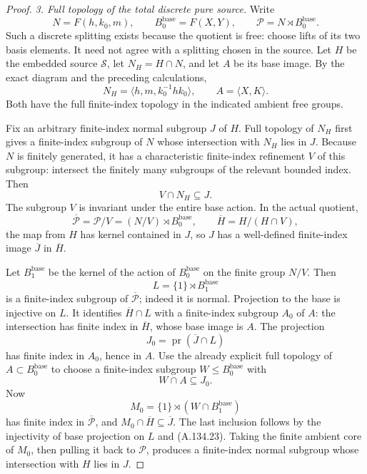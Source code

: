 \begin{proof}
\emph{3. Full topology of the total discrete pure source.}
Write
\[
 N=F(h,k_0,m),\qquad B_0^{\mathrm{base}}=F(X,Y),
 \qquad \mathcal P=N\rtimes B_0^{\mathrm{base}}.
 \tag{A.134.18}
\]
Such a discrete splitting exists because the quotient is
free: choose lifts of its two basis elements. It need not
agree with a splitting chosen in the source.
Let \(H\) be the embedded source \(\mathcal S\),
let \(N_H=H\cap N\), and let \(A\) be its base image.
By the exact diagram and the preceding calculations,
\[
 N_H=\langle h,m,k_0^{-1}hk_0\rangle,\qquad
                         A=\langle X,K\rangle.
 \tag{A.134.19}
\]
Both have the full finite-index topology in the indicated
ambient free groups.

Fix an arbitrary finite-index normal subgroup \(J\) of \(H\).
Full topology of \(N_H\) first gives a finite-index subgroup
of \(N\) whose intersection with \(N_H\) lies in \(J\).
Because \(N\) is finitely generated, it has a characteristic
finite-index refinement \(V\) of this subgroup: intersect
the finitely many subgroups of the relevant bounded index.
Then
\[
                  V\cap N_H\subseteq J.
 \tag{A.134.20}
\]
The subgroup \(V\) is invariant under the entire base action.
In the actual quotient,
\[
 \overline{\mathcal P}=\mathcal P/V
          =(N/V)\rtimes B_0^{\mathrm{base}},
 \qquad
 \overline H=H/(H\cap V),
 \tag{A.134.21}
\]
the map from \(H\) has kernel contained in \(J\), so \(J\)
has a well-defined finite-index image \(\overline J\)
in \(\overline H\).

Let \(B_1^{\mathrm{base}}\) be the kernel of the action of
\(B_0^{\mathrm{base}}\) on the finite group \(N/V\).
Then
\[
 L=\{1\}\rtimes B_1^{\mathrm{base}}
\]
is a finite-index subgroup of \(\overline{\mathcal P}\);
indeed it is normal. Projection to the base is injective
on \(L\). It identifies \(\overline H\cap L\) with a
finite-index subgroup \(A_0\) of \(A\): the intersection
has finite index in \(\overline H\), whose base image is \(A\).
The projection
\[
            J_0=\operatorname{pr}(\overline J\cap L)
 \tag{A.134.22}
\]
has finite index in \(A_0\), hence in \(A\).
Use the already explicit full topology of
\(A\subset B_0^{\mathrm{base}}\) to choose a finite-index
subgroup \(W\leq B_0^{\mathrm{base}}\) with
\[
                         W\cap A\subseteq J_0.
 \tag{A.134.23}
\]
Now
\[
       M_0=\{1\}\rtimes(W\cap B_1^{\mathrm{base}})
\]
has finite index in \(\overline{\mathcal P}\), and
\(M_0\cap\overline H\subseteq\overline J\).
The last inclusion follows by the injectivity of base
projection on \(L\) and (A.134.23).
Taking the finite ambient core of \(M_0\), then pulling
it back to \(\mathcal P\), produces a finite-index normal
subgroup whose intersection with \(H\) lies in \(J\).


\end{proof}
